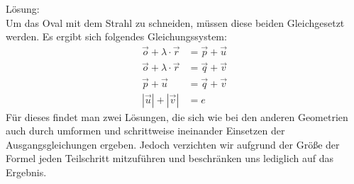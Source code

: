 \documentclass[reducespace,stylepage,semiarbeit]{spezidoc}
\begin{document}
Lösung: \\
Um das Oval mit dem Strahl zu schneiden, müssen diese beiden Gleichgesetzt werden. Es ergibt sich folgendes Gleichungssystem:
\begin{equation*}
\begin{split}
\vec{o} + \lambda \cdot \vec{r} &= \vec{p} + \vec{u} \\
\vec{o} + \lambda \cdot \vec{r} &= \vec{q} + \vec{v} \\
\vec{p} + \vec{u} &= \vec{q} + \vec{v} \\
|\vec{u}| + |\vec{v}| &= e
\end{split}
\end{equation*}
Für dieses findet man zwei Lösungen, die sich wie bei den anderen Geometrien auch durch umformen und schrittweise ineinander Einsetzen der Ausgangsgleichungen ergeben. Jedoch verzichten wir aufgrund der Größe der Formel jeden Teilschritt mitzuführen und beschränken uns lediglich auf das Ergebnis.
\end{document}
